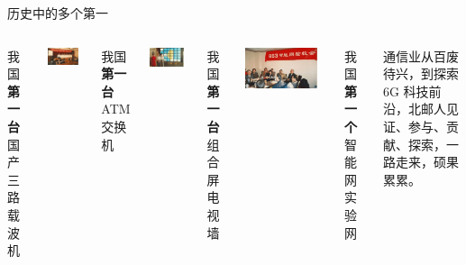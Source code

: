 \documentclass[aspectratio=169, utf8, fontset=windows]{beamer}
\begin{document}
\begin{frame}{历史中的多个第一}
\begin{columns}
        我国\textcolor{Fore}{\textbf{第一台}}国产三路载波机

        \vspace{2.3em}

        \includegraphics[width=0.9\textwidth]{./resources/6.jpg}

        我国\textcolor{Fore}{\textbf{第一台}} ATM 交换机

        \centering
        \scriptsize
        \includegraphics[width=0.9\textwidth]{./resources/7.jpg}

        我国\textcolor{Fore}{\textbf{第一台}}组合屏电视墙

        \vspace{2.3em}

        \includegraphics[width=0.9\textwidth]{./resources/8.jpg}

        我国\textcolor{Fore}{\textbf{第一个}}智能网实验网

        \setlength{\parindent}{2em}

        通信业从百废待兴，到探索 6G 科技前沿，北邮人见证、参与、贡献、探索，一路走来，硕果累累。

    \end{columns}
\end{frame}
\end{document}
